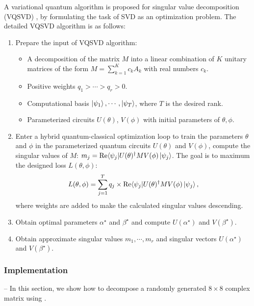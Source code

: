 A variational quantum algorithm is proposed for singular value decomposition (VQSVD) \cite{wang2021variational}, by formulating the task of SVD as an optimization problem. The detailed VQSVD algorithm is as follows:
\begin{enumerate}
    \item Prepare the input of VQSVD algorithm:
        \begin{itemize}
            \item A decomposition of the matrix $M$ into a linear combination of $K$ unitary matrices of the form $M = \sum_{k=1}^K c_k A_k$ with real numbers $c_k$.
            \item Positive weights $q_1 > \cdots > q_r > 0$.
            \item Computational basis {$\ket{\psi_1}, \cdots, \ket{\psi_T}$}, where $T$ is the desired rank.
            \item Parameterized circuits $U(\theta)$, $V(\phi)$ with initial parameters of $\theta, \phi$.
        \end{itemize}
    \item Enter a hybrid quantum-classical optimization loop to train the parameters $\theta$ and $\phi$ in the parameterized quantum circuits $U(\theta)$ and $V(\phi)$, compute the singular values of $M$: $m_j = \text{Re}\langle\psi_j|U(\theta)^{\dagger} M V(\phi)\ket{\psi_j}$. The goal is to maximum the designed loss $L(\theta, \phi)$:
    \begin{equation}
        L(\theta, \phi) = \sum_{j=1}^T q_j \times \text{Re} \langle\psi_j| U(\theta)^{\dagger} M V(\phi)\ket{\psi_j},
    \end{equation}
    where weights are added to make the calculated singular values descending.
    \item Obtain optimal parameters $\alpha^ \star$ and $\beta^\star$ and compute $U(\alpha^\star)$ and $V(\beta^\star)$.
    \item Obtain approximate singular values ${m_1, \cdots, m_r}$ and  singular vectors $U(\alpha^\star)$ and $V(\beta^\star)$.
\end{enumerate}

\subsubsection{Implementation} -- In this section, we show how to decompose a randomly generated $8 \times 8$ complex matrix using \MindQuantum.


